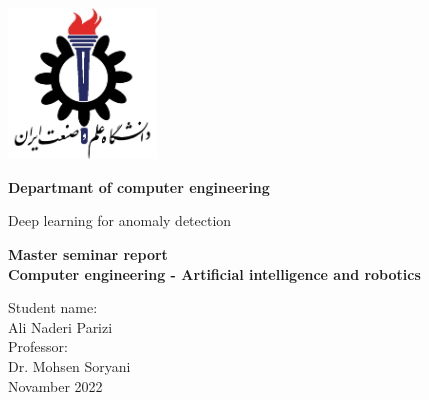 \documentclass[12pt,a4paper]{report}
\theoremstyle{definition}
\theoremstyle{definition}
\begin{document}
\begin{latin}

\newpage
\thispagestyle{empty}

	\vspace*{25mm}
	\centerline{\includegraphics[height=4cm]{./images/logos/iust.png}}

	\begin{center}
	\textbf{
Departmant of computer engineering
	}
	\\[1cm]
	\baselineskip=2cm
	{\titr
	\begin{Huge}
	Deep learning for anomaly detection\\[1cm]
	\end{Huge}}
	{\Large 
		\textbf{
			Master seminar report \\
Computer engineering - Artificial intelligence and robotics
		} \\[1cm]
	}

	{\Large { Student name:}
	\\
	{\Large  Ali Naderi Parizi}
	\\[.5cm]
	{\Large  Professor:}
	\\
	{\Large Dr.  Mohsen Soryani}
	\\[.6cm]
	}
Novamber 2022
	\end{center}

\end{latin}
\end{document}
